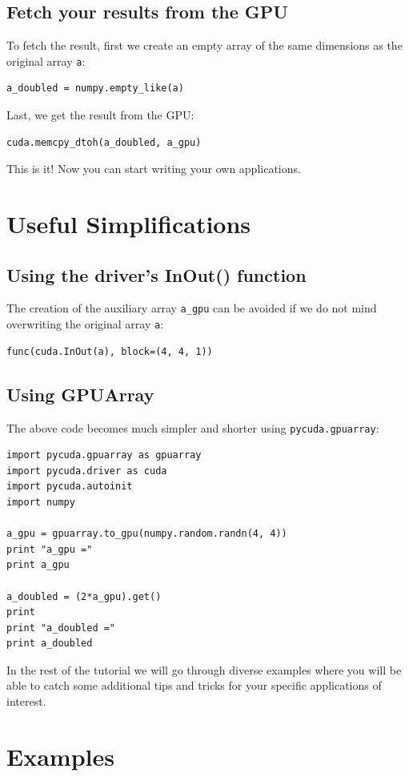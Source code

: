 \documentclass{article}
\begin{document}
\subsection{Fetch your results from the GPU}

To fetch the result, first we create an empty array of the same dimensions
as the original array {\tt a}:
\begin{verbatim}
a_doubled = numpy.empty_like(a)
\end{verbatim}
Last, we get the result from the GPU:
\begin{verbatim}
cuda.memcpy_dtoh(a_doubled, a_gpu)
\end{verbatim}
This is it! Now you can start writing your own applications.

\section{Useful Simplifications}

\subsection{Using the driver's InOut() function}

The creation of the auxiliary array {\tt a\_gpu} can be avoided if we do not 
mind overwriting the original array {\tt a}:
\begin{verbatim}
func(cuda.InOut(a), block=(4, 4, 1))
\end{verbatim}

\subsection{Using GPUArray}

The above code becomes much simpler and shorter using {\tt pycuda.gpuarray}:

\begin{verbatim}
import pycuda.gpuarray as gpuarray
import pycuda.driver as cuda
import pycuda.autoinit
import numpy

a_gpu = gpuarray.to_gpu(numpy.random.randn(4, 4))
print "a_gpu ="
print a_gpu

a_doubled = (2*a_gpu).get()
print
print "a_doubled ="
print a_doubled
\end{verbatim}
In the rest of the tutorial we will go through diverse examples where
you will be able to catch some additional tips and tricks for your 
specific applications of interest.

\section{Examples}
\end{document}
